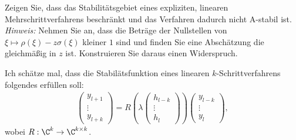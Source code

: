 \begin{exercise}
Zeigen Sie, dass das Stabilitätsgebiet eines expliziten, linearen Mehrschrittverfahrens
beschränkt und das Verfahren dadurch nicht A-stabil ist. \\
\textit{Hinweis:} Nehmen Sie an, dass die Beträge der Nullstellen von $\xi \mapsto \rho(\xi) - z\sigma(\xi)$
kleiner $1$ sind und finden Sie eine Abschätzung die gleichmäßig in $z$ ist.
Konstruieren Sie daraus einen Widerspruch.
\end{exercise}
\begin{solution}
Ich schätze mal, dass die Stabilätsfunktion eines linearen $k$-Schrittverfahrens
folgendes erfüllen soll:
\begin{align*}
  \begin{pmatrix}
    y_{l + 1} \\ \vdots \\ y_{l + k}
  \end{pmatrix}
  =
  R\left(\lambda \begin{pmatrix}
    h_{l-k} \\ \vdots \\ h_{l}
  \end{pmatrix}\right)
  \begin{pmatrix}
    y_{l - k} \\ \vdots \\ y_{l}
  \end{pmatrix},
\end{align*}
wobei $R: \C^k \to \C^{k \times k}$.
\end{solution}
